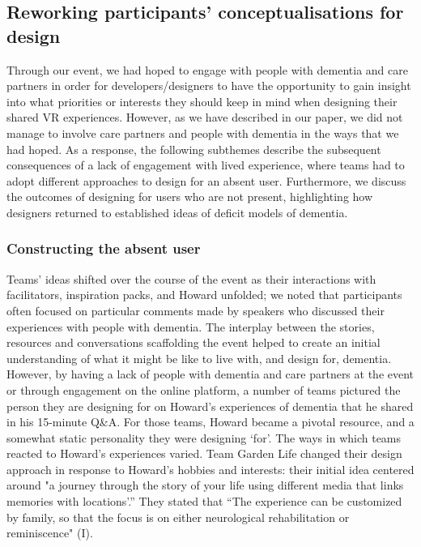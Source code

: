 \subsection{Reworking participants' conceptualisations for design}
\label{LearningEvent:ThemeTwo}
Through our event, we had hoped to engage with people with dementia and care partners in order for developers/designers to have the opportunity to gain insight into what priorities or interests they should keep in mind when designing their shared VR experiences. However, as we have described in our paper, we did not manage to involve care partners and people with dementia in the ways that we had hoped. As a response, the following subthemes describe the subsequent consequences of a lack of engagement with lived experience, where teams had to adopt different approaches to design for an absent user. Furthermore, we discuss the outcomes of designing for users who are not present, highlighting how designers returned to established ideas of deficit models of dementia. 
\subsubsection{Constructing the absent user}
\label{ThemeTwo:subthemeOne}
Teams’ ideas shifted over the course of the event as their interactions with facilitators, inspiration packs, and Howard unfolded; we noted that participants often focused on particular comments made by speakers who discussed their experiences with people with dementia. The interplay between the stories, resources and conversations scaffolding the event helped to create an initial understanding of what it might be like to live with, and design for, dementia. However, by having a lack of people with dementia and care partners at the event or through engagement on the online platform, a number of teams pictured the person they are designing for on Howard’s experiences of dementia that he shared in his 15-minute Q\&A. For those teams, Howard became a pivotal resource, and a somewhat static personality they were designing ‘for’. The ways in which teams reacted to Howard’s experiences varied. Team Garden Life changed their design approach in response to Howard's hobbies and interests: their initial idea centered around "a journey through the story of your life using different media that links memories with locations'.” They stated that “The experience can be customized by family, so that the focus is on either neurological rehabilitation or reminiscence" (I). 

